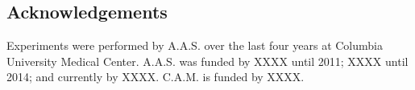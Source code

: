 \subsection*{Acknowledgements}
\label{subsec:acknowledgements}
Experiments were performed by A.A.S. over the last four years at Columbia University Medical Center. 
A.A.S. was funded by XXXX until 2011; XXXX until 2014; and currently by XXXX.
C.A.M. is funded by XXXX. 

